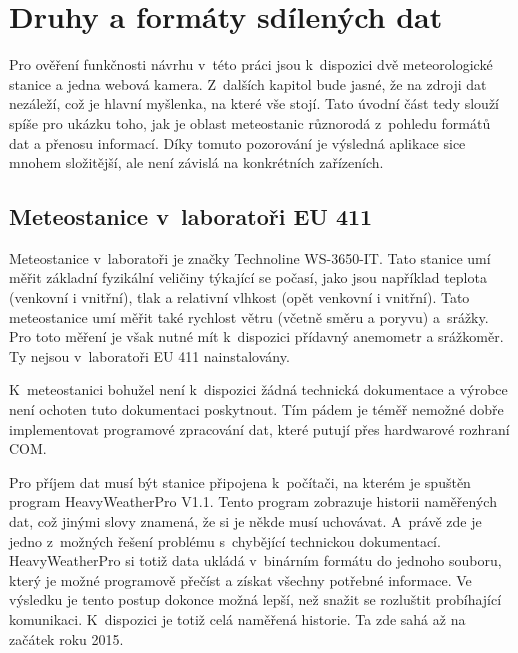 \chapter{Druhy a formáty sdílených dat}
Pro ověření funkčnosti návrhu v~této práci jsou k~dispozici dvě meteorologické stanice a jedna webová kamera. Z~dalších kapitol bude jasné, že na zdroji dat nezáleží, což je hlavní myšlenka, na které vše stojí. Tato úvodní část tedy slouží spíše pro ukázku toho, jak je oblast meteostanic různorodá z~pohledu formátů dat a přenosu informací. Díky tomuto pozorování je výsledná aplikace sice mnohem složitější, ale není závislá na konkrétních zařízeních.


\section{Meteostanice v~laboratoři EU 411}
Meteostanice v~laboratoři je značky Technoline WS-3650-IT. Tato stanice umí měřit základní fyzikální veličiny týkající se počasí, jako jsou například teplota (venkovní i vnitřní), tlak a relativní vlhkost (opět venkovní i vnitřní). Tato meteostanice umí měřit také rychlost větru (včetně směru a poryvu) a~srážky. Pro toto měření je však nutné mít k~dispozici přídavný anemometr a srážkoměr. Ty nejsou v~laboratoři EU 411 nainstalovány.

K~meteostanici bohužel není k~dispozici žádná technická dokumentace a výrobce není ochoten tuto dokumentaci poskytnout. Tím pádem je téměř nemožné dobře implementovat programové zpracování dat, které putují přes hardwarové rozhraní COM.

Pro příjem dat musí být stanice připojena k~počítači, na kterém je spuštěn program HeavyWeatherPro V1.1. Tento program zobrazuje historii na\-mě\-ře\-ných dat, což jinými slovy znamená, že si je někde musí uchovávat. A~právě zde je jedno z~možných řešení problému s~chybějící technickou dokumentací. HeavyWeatherPro si totiž data ukládá v~binárním formátu do jednoho souboru, který je možné programově přečíst a získat všechny potřebné informace. Ve výsledku je tento postup dokonce možná lepší, než snažit se rozluštit probíhající komunikaci. K~dispozici je totiž celá naměřená historie. Ta zde sahá až na začátek roku 2015.


